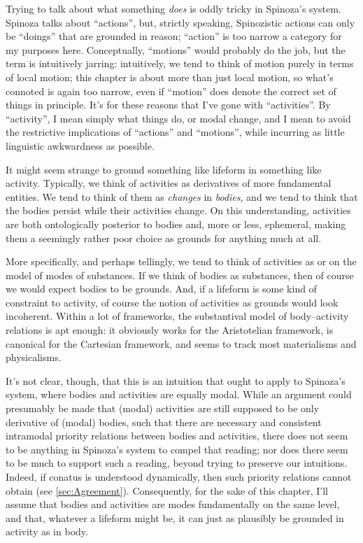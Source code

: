 \documentclass{article}
\newcommand{\dash}{\unskip{—}}
\begin{document}
Trying to talk about what something \emph{does} is oddly tricky in Spinoza's system. Spinoza talks about \enquote{actions}, but, strictly speaking, Spinozistic actions can only be \enquote{doings} that are grounded in reason; \enquote{action} is too narrow a category for my purposes here. Conceptually, \enquote{motions} would probably do the job, but the term is intuitively jarring: intuitively, we tend to think of motion purely in terms of local motion; this chapter is about more than just local motion, so what's connoted is again too narrow, even if \enquote{motion} does denote the correct set of things in principle. It's for these reasons that I've gone with \enquote{activities}. By \enquote{activity}, I mean simply what things do, or modal change, and I mean to avoid the restrictive implications of \enquote{actions} and \enquote{motions}, while incurring as little linguistic awkwardness as possible.

It might seem strange to ground something like lifeform in something like activity. Typically, we think of activities as derivatives of more fundamental entities. We tend to think of them as \emph{changes} in \emph{bodies}, and we tend to think that the bodies persist while their activities change. On this understanding, activities are both ontologically posterior to bodies and, more or less, ephemeral, making them a seemingly rather poor choice as grounds for anything much at all.

More specifically, and perhaps tellingly, we tend to think of activities as \dash or on the model of \dash modes of substances. If we think of bodies as substances, then of course we would expect bodies to be grounds. And, if a lifeform is some kind of constraint to activity, of course the notion of activities as grounds would look incoherent. Within a lot of frameworks, the substantival model of body–activity relations is apt enough: it obviously works for the Aristotelian framework, is canonical for the Cartesian framework, and seems to track most materialisms and physicalisms.

It's not clear, though, that this is an intuition that ought to apply to Spinoza's system, where bodies and activities are equally modal. While an argument could presumably be made that (modal) activities are still supposed to be only derivative of (modal) bodies, such that there are necessary and consistent intramodal priority relations between bodies and activities, there does not seem to be anything in Spinoza's system to compel that reading; nor does there seem to be much to support such a reading, beyond trying to preserve our intuitions. Indeed, if conatus is understood dynamically, then such priority relations cannot obtain (see \cref{sec:Agreement}). Consequently, for the sake of this chapter, I'll assume that bodies and activities are modes fundamentally on the same level, and that, whatever a lifeform might be, it can just as plausibly be grounded in activity as in body.
\end{document}
